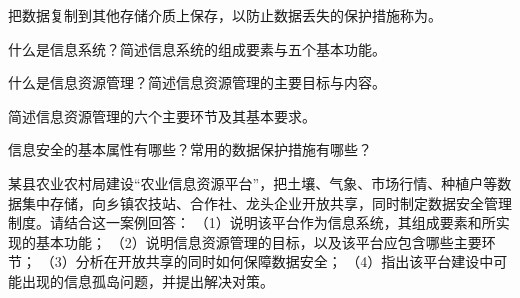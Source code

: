 \documentclass[a4paper,11pt]{article}
\begin{document}
\q 把数据复制到其他存储介质上保存，以防止数据丢失的保护措施称为\fillblanks[2.2cm]。

\newpage
{}
\q 什么是信息系统？简述信息系统的组成要素与五个基本功能。\anslines{2.4cm}

\q 什么是信息资源管理？简述信息资源管理的主要目标与内容。\anslines{2.4cm}

\q 简述信息资源管理的六个主要环节及其基本要求。\anslines{2.4cm}

\q 信息安全的基本属性有哪些？常用的数据保护措施有哪些？\anslines{2.4cm}

\newpage
{}
\q 某县农业农村局建设“农业信息资源平台”，把土壤、气象、市场行情、种植户等数据集中存储，向乡镇农技站、合作社、龙头企业开放共享，同时制定数据安全管理制度。请结合这一案例回答：
（1）说明该平台作为信息系统，其组成要素和所实现的基本功能；
（2）说明信息资源管理的目标，以及该平台应包含哪些主要环节；
（3）分析在开放共享的同时如何保障数据安全；
（4）指出该平台建设中可能出现的信息孤岛问题，并提出解决对策。\anslines{5cm}
\end{document}
